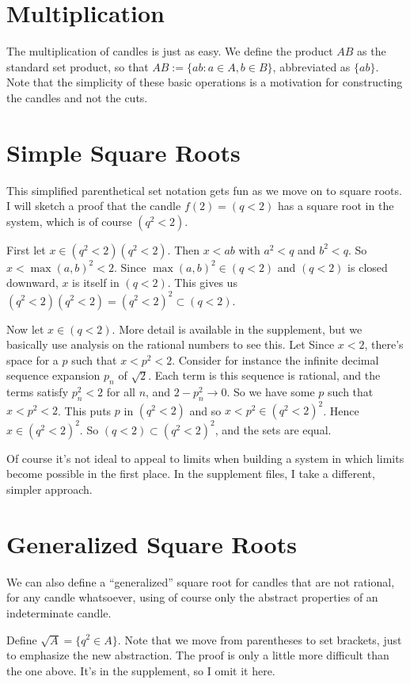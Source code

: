 \documentclass{article}
\newcommand{\q}{\enquote}
\begin{document}
{{\section{Multiplication}
The multiplication of candles is just as easy. We define the product $AB$ as the standard set product, so that $AB := \{ab : a \in A, b \in B \}$, abbreviated as $\{ab\}$. Note that the simplicity of these basic operations is a motivation for constructing the candles and not the cuts.


\section{Simple Square Roots}
This simplified parenthetical set notation gets fun as we move on to square roots.  I will sketch a proof that the candle $f(2) = (q < 2)$ has a square root in the system, which is of course $( q^2 < 2)$. 

First let $x \in ( q^2 < 2)( q^2 < 2)$. Then $x < ab$ with $a^2 < q$ and $ b^2 < q$. So $x < \max(a,b)^2 < 2$. Since $\max(a,b)^2 \in (q < 2)$ and $(q < 2)$ is closed downward, $x$ is itself in $(q < 2)$. This gives us $( q^2 < 2)( q^2 < 2) = ( q^2 < 2)^2 \subset (q < 2).$

Now let $x \in (q < 2)$. More detail is available in the supplement, but we basically use analysis on the rational numbers to see this. Let Since $x < 2$, there's space for a $p$ such that $x < p^2 < 2$. Consider for instance the infinite decimal sequence expansion $p_n$ of $\sqrt{2}$. Each term is this sequence is rational, and the terms satisfy $p_n^2 < 2$ for all $n$, and $2 - p_n^2 \to 0$.  So we have some $p$ such that $x < p^2 < 2$. This puts $p$ in $( q^2 < 2)$ and so $x < p^2 \in ( q^2 < 2)^2$. Hence $x \in ( q^2 < 2)^2$. So  $(q < 2) \subset ( q^2 < 2)^2$, and the sets are equal. 

Of course it's not ideal to appeal to limits when building a system in which limits become possible in the first place. In the supplement files, I take a different, simpler approach. 

\section{Generalized Square Roots}

We can also define a \q{generalized} square root for candles that are not rational, for any candle whatsoever, using of course only the abstract properties of an indeterminate candle. 

Define $\sqrt{A} = \{ q^2 \in A \}$. Note that we move from parentheses to set brackets, just to emphasize the new abstraction. The proof is only a little more difficult than the one above. It's in the supplement, so I omit it here. 
 
}}
\end{document}
